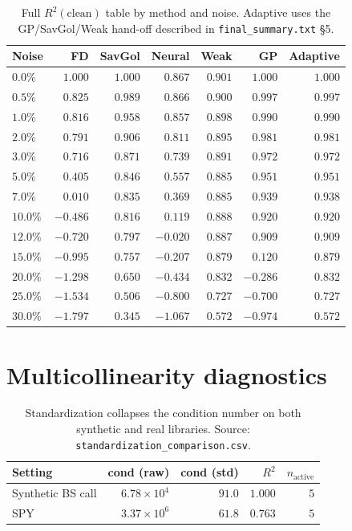 \documentclass[10pt]{article}
\begin{document}
\begin{table}[h]
\centering\footnotesize
\caption{Full $R^2(\text{clean})$ table by method and noise. Adaptive uses the GP/SavGol/Weak hand-off described in \texttt{final\_summary.txt} \S5.}
\label{tab:noise-full}
\begin{tabular}{lrrrrrr}
\toprule
Noise & FD & SavGol & Neural & Weak & GP & Adaptive \\
\midrule
$0.0\%$  & $1.000$ & $1.000$ & $0.867$ & $0.901$ & $1.000$ & $1.000$ \\
$0.5\%$  & $0.825$ & $0.989$ & $0.866$ & $0.900$ & $0.997$ & $0.997$ \\
$1.0\%$  & $0.816$ & $0.958$ & $0.857$ & $0.898$ & $0.990$ & $0.990$ \\
$2.0\%$  & $0.791$ & $0.906$ & $0.811$ & $0.895$ & $0.981$ & $0.981$ \\
$3.0\%$  & $0.716$ & $0.871$ & $0.739$ & $0.891$ & $0.972$ & $0.972$ \\
$5.0\%$  & $0.405$ & $0.846$ & $0.557$ & $0.885$ & $0.951$ & $0.951$ \\
$7.0\%$  & $0.010$ & $0.835$ & $0.369$ & $0.885$ & $0.939$ & $0.938$ \\
$10.0\%$ & $-0.486$ & $0.816$ & $0.119$ & $0.888$ & $0.920$ & $0.920$ \\
$12.0\%$ & $-0.720$ & $0.797$ & $-0.020$ & $0.887$ & $0.909$ & $0.909$ \\
$15.0\%$ & $-0.995$ & $0.757$ & $-0.207$ & $0.879$ & $0.120$ & $0.879$ \\
$20.0\%$ & $-1.298$ & $0.650$ & $-0.434$ & $0.832$ & $-0.286$ & $0.832$ \\
$25.0\%$ & $-1.534$ & $0.506$ & $-0.800$ & $0.727$ & $-0.700$ & $0.727$ \\
$30.0\%$ & $-1.797$ & $0.345$ & $-1.067$ & $0.572$ & $-0.974$ & $0.572$ \\
\bottomrule
\end{tabular}
\end{table}

\section{Multicollinearity diagnostics}\label{app:cond}
\begin{table}[h]
\centering\footnotesize
\caption{Standardization collapses the condition number on both synthetic and real libraries. Source: \texttt{standardization\_comparison.csv}.}
\label{tab:cond}
\begin{tabular}{lrrrr}
\toprule
Setting & cond (raw) & cond (std) & $R^2$ & $n_{\text{active}}$ \\
\midrule
Synthetic BS call & $6.78\!\times\!10^4$ & $\mathbf{91.0}$ & $1.000$ & $5$ \\
SPY                & $3.37\!\times\!10^6$ & $\mathbf{61.8}$ & $0.763$ & $5$ \\
\bottomrule
\end{tabular}
\end{table}
\end{document}
